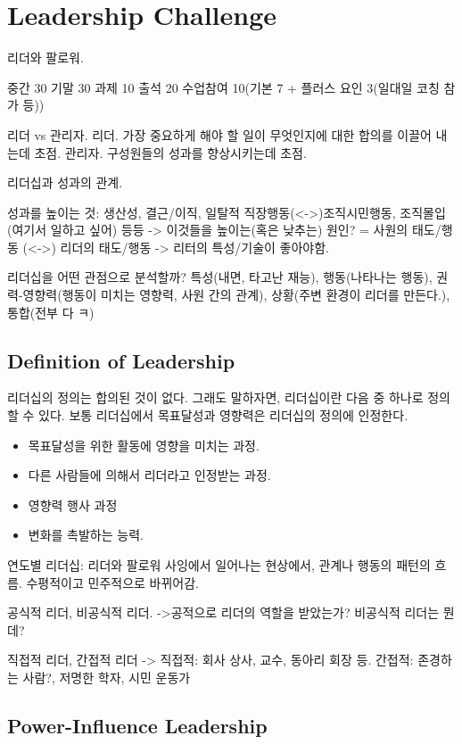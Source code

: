 \chapter{Leadership Challenge}

리더와 팔로워.

중간 30 기말 30 과제 10 출석 20 수업참여 10(기본 7 + 플러스 요인 3(일대일 코칭 참가 등))

리더 vs 관리자.
리더. 가장 중요하게 해야 할 일이 무엇인지에 대한 합의를 이끌어 내는데 초점.
관리자. 구성원들의 성과를 향상시키는데 초점.

리더십과 성과의 관계.

성과를 높이는 것: 생산성, 결근/이직, 일탈적 직장행동(<->)조직시민행동, 조직몰입(여기서 일하고 싶어) 등등
-> 이것들을 높이는(혹은 낮추는) 원인?
= 사원의 태도/행동 (<->) 리더의 태도/행동
-> 리터의 특성/기술이 좋아야함.

리더십을 어떤 관점으로 분석할까? 
특성(내면, 타고난 재능), 행동(나타나는 행동), 권력-영향력(행동이 미치는 영향력, 사원 간의 관계), 
상황(주변 환경이 리더를 만든다.), 통합(전부 다 ㅋ)

\section{Definition of Leadership}
리더십의 정의는 합의된 것이 없다. 그래도 말하자면, 리더십이란 다음 중 하나로 정의할 수 있다. 
보통 리더십에서 목표달성과 영향력은 리더십의 정의에 인정한다.
\begin{itemize}
  \item 목표달성을 위한 활동에 영향을 미치는 과정.
  \item 다른 사람들에 의해서 리더라고 인정받는 과정.
  \item 영향력 행사 과정
  \item 변화를 촉발하는 능력.
\end{itemize}

연도별 리더십: 리더와 팔로워 사잉에서 일어나는 현상에서, 관계나 행동의 패턴의 흐름.
수평적이고 민주적으로 바뀌어감.

공식적 리더, 비공식적 리더.
->공적으로 리더의 역할을 받았는가?
비공식적 리더는 뭔데?

직접적 리더, 간접적 리더
-> 직접적: 회사 상사, 교수, 동아리 회장 등. 간접적: 존경하는 사람?, 저명한 학자, 시민 운동가

\section{Power-Influence Leadership}

